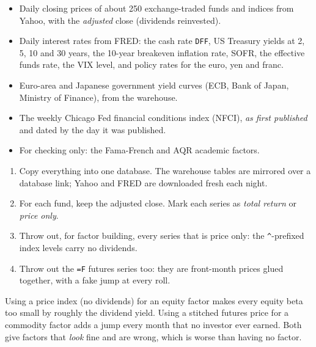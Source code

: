 \documentclass[11pt,a4paper]{article}
\begin{document}
\begin{ingredients}
\begin{itemize}[leftmargin=1.2em]
  \item Daily closing prices of about 250 exchange-traded funds and indices from Yahoo, with the \emph{adjusted} close (dividends reinvested).
  \item Daily interest rates from FRED: the cash rate \texttt{DFF}, US Treasury yields at 2, 5, 10 and 30 years, the 10-year breakeven inflation rate, SOFR, the effective funds rate, the VIX level, and policy rates for the euro, yen and franc.
  \item Euro-area and Japanese government yield curves (ECB, Bank of Japan, Ministry of Finance), from the warehouse.
  \item The weekly Chicago Fed financial conditions index (NFCI), \emph{as first published} and dated by the day it was published.
  \item For checking only: the Fama-French and AQR academic factors.
\end{itemize}
\end{ingredients}

\begin{method}
\begin{enumerate}[leftmargin=1.4em]
  \item Copy everything into one database. The warehouse tables are mirrored over a database link; Yahoo and FRED are downloaded fresh each night.
  \item For each fund, keep the adjusted close. Mark each series as \emph{total return} or \emph{price only}.
  \item Throw out, for factor building, every series that is price only: the \texttt{\^{}}-prefixed index levels carry no dividends.
  \item Throw out the \texttt{=F} futures series too: they are front-month prices glued together, with a fake jump at every roll.
\end{enumerate}
\end{method}

\begin{warn}
Using a price index (no dividends) for an equity factor makes every equity beta too
small by roughly the dividend yield. Using a stitched futures price for a commodity
factor adds a jump every month that no investor ever earned. Both give factors that
\emph{look} fine and are wrong, which is worse than having no factor.
\end{warn}
\end{document}
